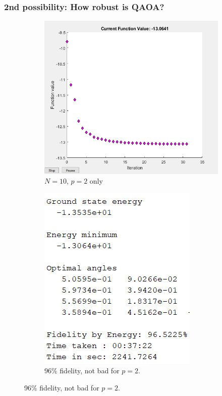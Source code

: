 \documentclass{beamer}
\theoremstyle{definition}
\begin{document}


\begin{frame}
\frametitle{2nd possibility: How robust is QAOA?}





\begin{figure}[!htb]
	\centering
	\begin{subfigure}{0.5 \textwidth}
		\centering
		\includegraphics[scale=0.30]{N_10_p_2.PNG}
		\caption{$N=10$, $p=2$ only}
	\end{subfigure}%
	\begin{subfigure}{0.5 \textwidth}
		\centering
		\includegraphics[scale=0.47]{N_10_p_2_out}
		\caption{96\% fidelity, not bad for $p=2$.}
	\end{subfigure}
\end{figure}


\end{frame}
\end{document}
